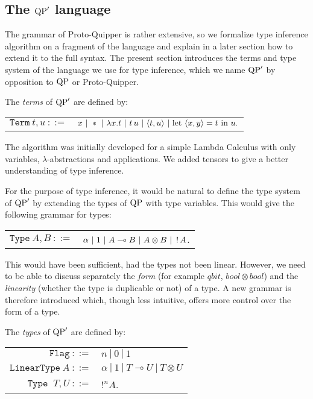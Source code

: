 
\subsection{The ${\rm QP}'$ language}

The grammar of Proto-Quipper is rather extensive, so we formalize type inference algorithm on a fragment of the language and explain in a later section how to extend it to the full syntax. The present section introduces the terms and type system of the language we use for type inference, which we name ${\rm QP}'$ by opposition to ${\rm QP}$ or Proto-Quipper. 

\begin{defn} The \emph{terms} of ${\rm QP}'$ are defined by:
	\begin{center}
	\begin{tabular}{rl}
		$\texttt{Term} ~t,u~ ::=$ & $x ~|~ * ~|~ \lambda x.t ~|~ t \, u ~|~ \langle t, u \rangle ~|~ \text{let}~ \langle x, y \rangle = t ~\text{in}~ u. $
	\end{tabular}
	\end{center}
\end{defn}

The algorithm was initially developed for a simple Lambda Calculus with only variables, $\lambda$-abstractions and applications. We added tensors to give a better understanding of type inference.

For the purpose of type inference, it would be natural to define the type system of ${\rm QP}'$ by extending the types of ${\rm QP}$ with type variables. This would give the following grammar for types:
	\begin{center}
	\begin{tabular}{rl}
		$\texttt{Type} ~A,B~ ::=$ & $\alpha ~|~ 1 ~|~ A \multimap B ~|~ A \otimes B ~|~ \,!\, A$.
	\end{tabular}
	\end{center}
This would have been sufficient, had the types not been linear. However, we need to be able to discuss separately the \textit{form} (for example $qbit$, $bool \otimes bool$) and the \textit{linearity} (whether the type is duplicable or not) of a type. A new grammar is therefore introduced which, though less intuitive, offers more control over the form of a type.

\begin{defn} The \emph{types} of ${\rm QP}'$ are defined by:
	\begin{center}
	\begin{tabular}{rl}
		$\texttt{Flag}~ ::=$ & $n ~|~ 0 ~|~ 1$ \\		
		$\texttt{LinearType} ~A~ ::=$ & $\alpha ~|~ 1 ~|~ T \multimap U ~|~ T \otimes U$ \\
		$\texttt{Type	} ~T,U~ ::=$ & $!^n A$.
	\end{tabular}
	\end{center}
\end{defn}

